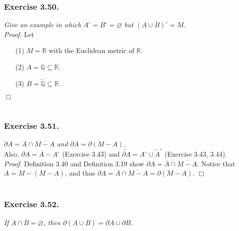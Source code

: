\documentclass{article}
\begin{document}



\subsubsection*{Exercise 3.50.}
\emph{Give an example in which $A^{\circ} = B^{\circ} = \varnothing$ but
$(A \cup B)^{\circ} = M$. } \\

\emph{Proof.}
Let
\begin{enumerate}
\item[(1)]
$M = \mathbb{R}$ with the Euclidean metric of $\mathbb{R}$.
\item[(2)]
$A = \mathbb{Q} \subseteq \mathbb{R}$.
\item[(3)]
$B = \widetilde{\mathbb{Q}} \subseteq \mathbb{R}$.
\end{enumerate}
$\Box$ \\\\






\subsubsection*{Exercise 3.51.}
\emph{$\partial A = \overline{A} \cap \overline{M-A}$ and
$\partial A = \partial(M - A)$.} \\

Also, $\partial A = \overline{A} - A^{\circ}$ (Exercise 3.43)
and $\widetilde{\partial A} = A^{\circ} \cup \widetilde{A}^{\circ}$
(Exercise 3.43, 3.44). \\

\emph{Proof.}
Definition 3.40 and Definition 3.19 show $\partial A = \overline{A} \cap \overline{M-A}$.
Notice that $A = M - (M-A)$, and thus
$\partial A = \overline{A} \cap \overline{M-A} = \partial(M - A)$.
$\Box$ \\\\






\subsubsection*{Exercise 3.52.}
\emph{If $\overline{A} \cap \overline{B} = \varnothing$,
then $\partial(A \cup B) = \partial A \cup \partial B$.} \\
\end{document}
